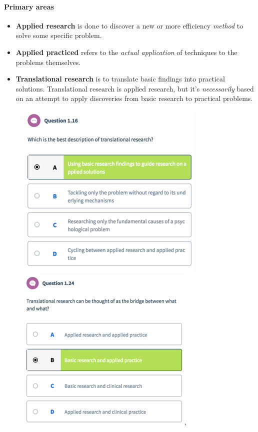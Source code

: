 \documentclass{article}
\begin{document}
 	\paragraph{Primary areas}
 	\begin{itemize}
 		\item \textbf{Applied research} is done to discover a new or more efficiency \emph{method} to solve some specific problem.
 		\item \textbf{Applied practiced} refers to the \emph{actual application} of techniques to the problems themselves.
 		\item \textbf{Translational research} is to translate basic findings into practical solutions. Translational research is applied research, but it's \emph{necessarily} based on an attempt to apply discoveries from basic research to practical problems.
 	\end{itemize}
 	\begin{figure}
 		\centering
 		\includegraphics{psy100/0116}
 		\includegraphics{psy100/0124}`
 	\end{figure}
\end{document}
